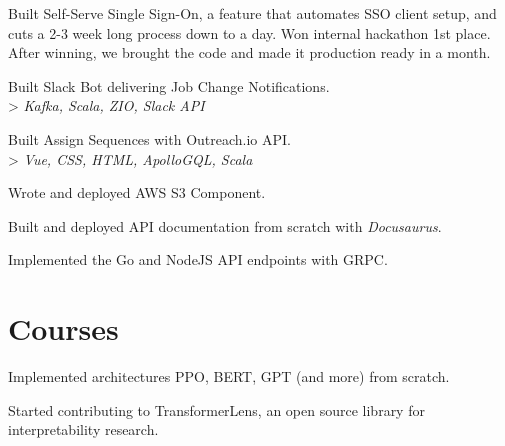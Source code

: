 \documentclass[]{deedy-resume-openfont}
\begin{document}
\begin{minipage}[t]{0.70\textwidth}
\begin{tightemize}
\end{tightemize}
\sectionsep
{}
\vspace{\topsep} %
\begin{tightemize}
\item Built Self-Serve Single Sign-On, a feature that automates SSO client setup, and cuts a 2-3 week long process down to a day. 
Won internal hackathon 1st place. After winning, we brought the code and made it production ready in a month.
\item Built Slack Bot delivering Job Change Notifications. \\ > \emph{Kafka, Scala, ZIO, Slack API}
\item Built Assign Sequences with Outreach.io API.\\ > \emph{Vue, CSS, HTML, ApolloGQL, Scala}
\end{tightemize}
\sectionsep
{}
\vspace{\topsep} %
\begin{tightemize}
\item Wrote and deployed AWS S3 Component.
\item Built and deployed API documentation from scratch with \textit{Docusaurus}.
\item Implemented the Go and NodeJS API endpoints with GRPC.
\end{tightemize}
\sectionsep


\section{Courses}

\begin{tightemize}
\item Implemented architectures PPO, BERT, GPT (and more) from scratch.
\item Started contributing to TransformerLens, an open source library for interpretability research.
\end{tightemize}
\sectionsep

\end{minipage}
\end{document}
